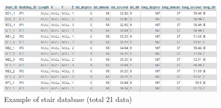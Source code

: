 \begin{figure}[h!]
	\centering
	\includegraphics[scale=0.6]{DBstair.PNG}
	\caption{Example of stair database (total 21 data)
	}
	\label{DBstairt}
\end{figure}

\vspace{30mm}
